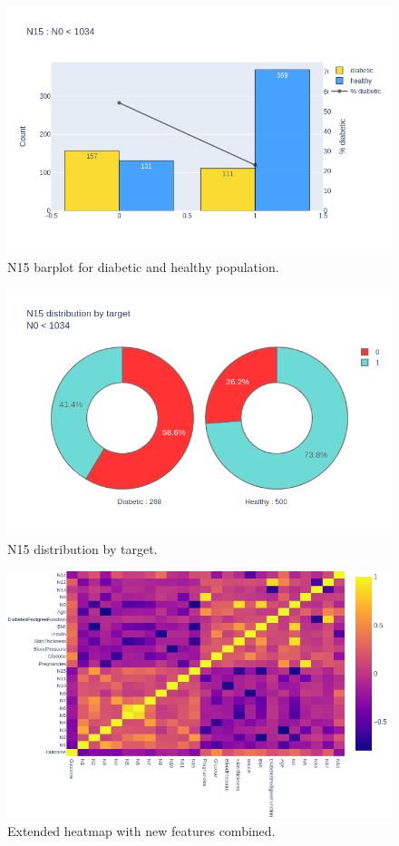 \documentclass[12pt]{article}
\begin{document}
\begin{figure}[ht]
\centering
\includegraphics[width=1\textwidth]{newplot(40).png}
\caption{\label{fig:47} N15 barplot for diabetic and healthy population.}
\end{figure}

\begin{figure}[ht]
\centering
\includegraphics[width=1\textwidth]{newplot(41).png}
\caption{\label{fig:48} N15 distribution by target.}
\end{figure}

\begin{figure}[ht]
\centering
\includegraphics[width=1\textwidth]{newplot(42).png}
\caption{\label{fig:49} Extended heatmap with new features combined.}
\end{figure}
\clearpage
\newpage
\end{document}
